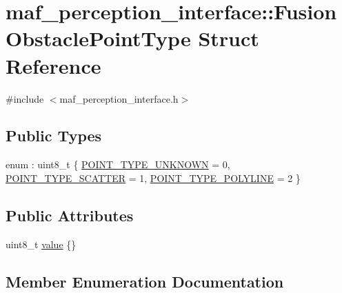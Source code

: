 \hypertarget{structmaf__perception__interface_1_1FusionObstaclePointType}{}\section{maf\+\_\+perception\+\_\+interface\+:\+:Fusion\+Obstacle\+Point\+Type Struct Reference}
\label{structmaf__perception__interface_1_1FusionObstaclePointType}


{\ttfamily \#include $<$maf\+\_\+perception\+\_\+interface.\+h$>$}

\subsection*{Public Types}
\begin{DoxyCompactItemize}
\item 
enum \+: uint8\+\_\+t \{ \hyperlink{structmaf__perception__interface_1_1FusionObstaclePointType_a0c2fd29b53841fa20be42e383274ea9ca1b222f0e3b3aecb474dbd8b3a37510a6}{P\+O\+I\+N\+T\+\_\+\+T\+Y\+P\+E\+\_\+\+U\+N\+K\+N\+O\+WN} = 0, 
\hyperlink{structmaf__perception__interface_1_1FusionObstaclePointType_a0c2fd29b53841fa20be42e383274ea9cad6bfa46883cc9ce0aa28f417c2bad487}{P\+O\+I\+N\+T\+\_\+\+T\+Y\+P\+E\+\_\+\+S\+C\+A\+T\+T\+ER} = 1, 
\hyperlink{structmaf__perception__interface_1_1FusionObstaclePointType_a0c2fd29b53841fa20be42e383274ea9ca35d7fba0698bf42d46d64742fbcd7243}{P\+O\+I\+N\+T\+\_\+\+T\+Y\+P\+E\+\_\+\+P\+O\+L\+Y\+L\+I\+NE} = 2
 \}
\end{DoxyCompactItemize}
\subsection*{Public Attributes}
\begin{DoxyCompactItemize}
\item 
uint8\+\_\+t \hyperlink{structmaf__perception__interface_1_1FusionObstaclePointType_a73cf0610596c0ad04a2eaa7743e9f9eb}{value} \{\}
\end{DoxyCompactItemize}


\subsection{Member Enumeration Documentation}
\mbox{\label{structmaf__perception__interface_1_1FusionObstaclePointType_a0c2fd29b53841fa20be42e383274ea9c}} 
